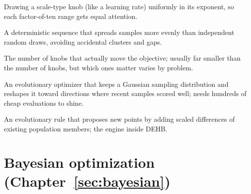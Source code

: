 \begin{description}[leftmargin=1.5em, itemsep=1pt, font=\normalfont\bfseries]
\item[log-uniform sampling] Drawing a scale-type knob (like a learning
rate) uniformly in its exponent, so each factor-of-ten range gets equal
attention.
\item[Sobol points] A deterministic sequence that spreads samples more
evenly than independent random draws, avoiding accidental clusters and
gaps.
\item[effective dimensionality] The number of knobs that actually move
the objective; usually far smaller than the number of knobs, but which
ones matter varies by problem.
\item[CMA-ES] An evolutionary optimizer that keeps a Gaussian sampling
distribution and reshapes it toward directions where recent samples
scored well; needs hundreds of cheap evaluations to shine.
\item[differential evolution] An evolutionary rule that proposes new
points by adding scaled differences of existing population members;
the engine inside DEHB.
\end{description}

\section*{Bayesian optimization (Chapter~\ref{sec:bayesian})}

